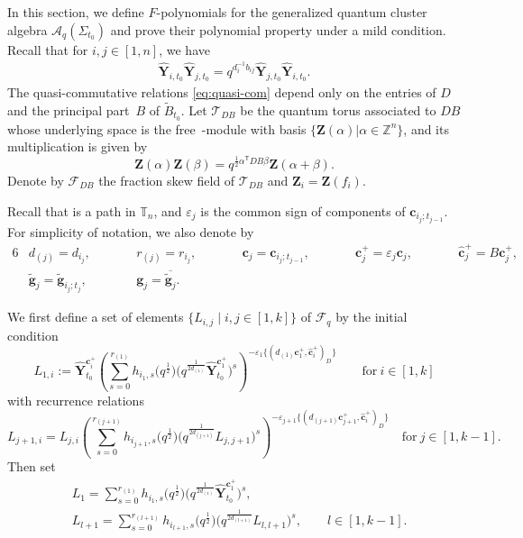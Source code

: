 \documentclass[10pt,a4paper]{amsart}
\numberwithin{equation}{section}
\begin{document}
 In this section, we define $F$-polynomials for the generalized quantum cluster algebra $\mathcal{A}_q(\Sigma_{t_0})$ and prove their polynomial property under a mild condition.
Recall that for $i,j\in[1,n]$, we have
\begin{align}\label{eq:quasi-com}
\mathbf{\hat{Y}}_{i,t_{0}}\mathbf{\hat{Y}}_{j,t_{0}}=q^{d_{i}^{-1}b_{ij}}\mathbf{\hat{Y}}_{j,t_{0}}\mathbf{\hat{Y}}_{i,t_{0}}.
\end{align}
The quasi-commutative relations \eqref{eq:quasi-com} depend only on the entries of $D$ and the principal part~$B$ of $\tilde{B}_{t_0}$.
Let $\mathcal{T}_{DB}$ be the quantum torus associated to $DB$ whose underlying space is the free~-module with basis $\{\mathbf{Z}(\alpha)| \alpha\in\mathbb{Z}^{n}\}$, and its multiplication is given by
\[\mathbf{Z}(\alpha)\mathbf{Z}(\beta)=q^{\frac{1}{2}\alpha^{\mathsf T}DB\beta}\mathbf{Z}(\alpha+\beta).\]
Denote by $\mathcal{F}_{DB}$ the fraction skew field of $\mathcal{T}_{DB}$ and $\mathbf{Z}_{i}=\mathbf{Z}(f_{i})$.

Recall that  is a path in $\mathbb{T}_n$, and $\varepsilon_{j}$ is the common sign of components of $\mathbf{c}_{i_j;t_{j-1}}$. For simplicity of notation, we also denote by
\begin{alignat*}{6}
& d_{(j)}=d_{i_j},\qquad&&
r_{(j)}=r_{i_j},  \qquad &&  \mathbf{c}_{j}=\mathbf{c}_{i_j;t_{j-1}},\qquad&&    \mathbf{c}_{j}^+=\varepsilon_{j}\mathbf{c}_{j}, \qquad&&   \mathbf{\hat{c}}_{j}^+=B\mathbf{c}_{j}^+,& \\
& \mathbf{\tilde{g}}_{j}=\mathbf{\tilde{g}}_{i_j;t_j}, \qquad&&   \mathbf{g}_{j}=\overline{\mathbf{\tilde{g}}_{j}}.&&&&&&&
\end{alignat*}

We first define a set of elements $\{ L_{i,j}\mid i,j\in [1,k]\}$ of $\mathcal{F}_q$ by the initial condition
\[L_{1,i}:=\mathbf{\hat{Y}}_{t_{0}}^{\mathbf{c}_{i}^{+}}\left(\sum\limits^{r_{(1)}}_{s=0}h_{i_{1},s}
\bigl(q^{\frac{1}{2}}\bigr)\bigl(q^{\frac{1}{2d_{(1)}}}\mathbf{\hat{Y}}_{t_0}^{\mathbf{c}_{1}^{+}}\bigr)^{s}\right)^{-\varepsilon_{1}\{(d_{(1)}\mathbf{c}_{1}^{+},\mathbf{\hat{c}}_{i}^{+})_{D}\}} \qquad \text{for}\  i\in [1,k]
\]
with recurrence relations
\[
 L_{j+1,i}=L_{j,i}\left(\sum\limits^{r_{(j+1)}}_{s=0}h_{i_{j+1},s}\bigl(q^{\frac{1}{2}}\bigr)
 \bigl(q^{\frac{1}{2d_{(j+1)}}}L_{j,j+1}\bigr)^{s} \right)^{-\varepsilon_{j+1}\{(d_{(j+1)}\mathbf{c}_{j+1}^{+},\mathbf{\hat{c}}_{i}^{+})_{D}\}} \quad \text{for}\  j \in [1,k-1].
\]
Then set
\begin{align*}
 &L_1=\sum\limits^{r_{(1)}}_{s=0}h_{i_{1},s}\bigl(q^{\frac{1}{2}}\bigr)\bigl(q^{\frac{1}{2d_{(1)}}}\mathbf{\hat{Y}}_{t_{0}}^{\mathbf{c}_{1}^{+}}\bigr)^{s},\\
 &L_{l+1}=\sum\limits_{s=0}^{r_{(l+1)}}h_{i_{l+1},s}\bigl(q^{\frac{1}{2}}\bigr)\bigl(q^{\frac{1}{2d_{(l+1)}}}L_{l,l+1}\bigr)^{s},\qquad l\in[1,k-1].
 \end{align*}
\end{document}
